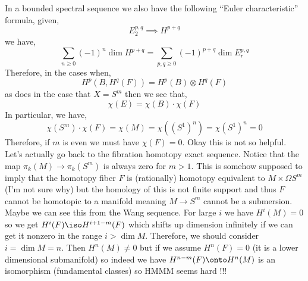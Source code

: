 \documentclass[12pt]{article}
\begin{document}
In a bounded spectral sequence we also have the following ``Euler characteristic'' formula, given,
\[ E^{p,q}_2 \implies H^{p+q} \]
we have,
\[ \sum_{n \ge 0} (-1)^n \dim{H^{p+q}} = \sum_{p,q \ge 0} (-1)^{p+q} \dim{E^{p,q}_r} \]
Therefore, in the cases when,
\[ H^p(B, H^q(F)) = H^p(B) \otimes H^q(F) \]
as does in the case that $X = S^m$ then we see that,
\[ \chi(E) = \chi(B) \cdot \chi(F) \]
In particular, we have,
\[ \chi(S^m) \cdot \chi(F) = \chi(M) = \chi((S^1)^n) = \chi(S^1)^n = 0 \]
Therefore, if $m$ is even we must have $\chi(F) = 0$. Okay this is not so helpful. 
\bigskip\\
Let's actually go back to the fibration homotopy exact sequence. Notice that the map $\pi_k(M) \to \pi_k(S^m)$ is always zero for $m > 1$. This is somehow supposed to imply that the homotopy fiber $F$ is (rationally) homotopy equivalent to $M \times \Omega S^m$ (I'm not sure why) but the homology of this is not finite support and thus $F$ cannot be homotopic to a manifold meaning $M \to S^m$ cannot be a submersion. 
\bigskip\\
Maybe we can see this from the Wang sequence. For large $i$ we have $H^i(M) = 0$ so we get $H^{i}(F) \iso H^{i+1-m}(F)$ which shifts up dimension infinitely if we can get it nonzero in the range $i > \dim{M}$. Therefore, we should consider $i = \dim{M} = n$. Then $H^n(M) \neq 0$ but if we assume $H^n(F) = 0$ (it is a lower dimensional submanifold) so indeed we have $H^{n-m}(F) \onto H^n(M)$ is an isomorphism (fundamental classes) so HMMM seems hard !!!
\end{document}
